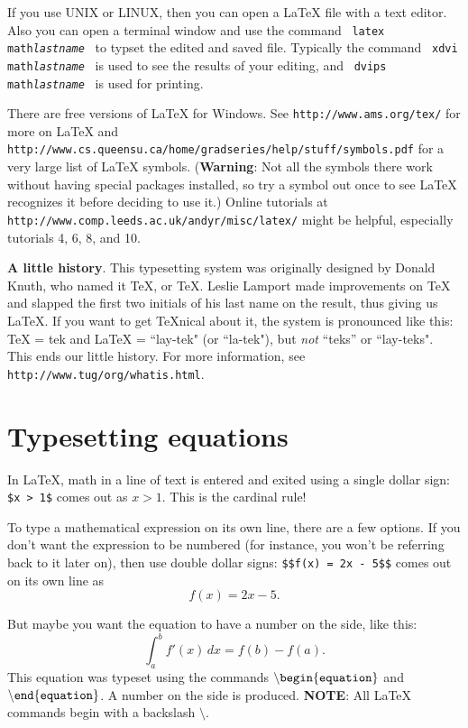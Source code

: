 \documentclass[12pt,letterpaper]{amsart}
\newcommand{\latex}{\LaTeX}
\newcommand{\tex}{\TeX}
\newcommand{\sm}{\setminus}
\newcommand{\bgn}[1]{$\tt {\sm}begin\{#1\}$}
\newcommand{\nd}[1]{$\tt {\sm}end\{#1\}$}
\theoremstyle{plain}
\theoremstyle{definition}
\numberwithin{equation}{section}
\begin{document}
If you use UNIX or LINUX, then  you can open a \latex{} file with a text 
editor. Also you 
can open a terminal window and use the command \ {\tt latex 
math{\it lastname}} \ to typset the edited and saved file. Typically the 
command \ {\tt xdvi math{\it lastname}} \ is used to see the results 
of your editing, and \ {\tt dvips math{\it lastname}} \ is used for 
printing. 

There are free versions of \latex{} for Windows. See 
{\tt http://www.ams.org/tex/}  
for more on \latex{} and 
{\tt http://www.cs.queensu.ca/home/gradseries/help/stuff/symbols.pdf} 
for a very large list of \latex{} symbols. 
({\bf Warning}: Not all the symbols there work without having special 
packages installed, so try a symbol out once to see \latex{} 
recognizes it before deciding to use it.) 
Online tutorials at 
{\tt http://www.comp.leeds.ac.uk/andyr/misc/latex/} 
might be helpful, especially 
tutorials 4, 6, 8, and 10. 

{\bf A little history}. This typesetting system was originally designed by Donald Knuth, 
who named it
TeX, or \tex.  Leslie Lamport made improvements on \tex{} 
and slapped the first two initials of his last name on the result, thus giving us 
\latex.  If you want to get \tex{nical} about it, the system is pronounced 
like this: 
\tex{} = tek and \latex{} = ``lay-tek" (or ``la-tek"), but {\it not} 
``teks'' or ``lay-teks". 
This ends our little history.  For more information, see {\tt http://www.tug/org/whatis.html}.



\section{Typesetting equations}\label{tsetsec}


In \latex, math in a line of text is entered and exited using 
a single dollar sign: {\tt \$x > 1\$} comes out as $x > 1$. 
This is the cardinal rule!  

To type a mathematical expression on its own line, 
there are a few options.
If you don't want the expression to be numbered 
(for instance, you won't be referring back to it later on), then use
double dollar signs: {\tt \$\$f(x) = 2x - 5\$\$} comes out 
on its own line as 
$$
f(x) = 2x - 5.
$$


But maybe you want the equation to have a number on the side, like this:
\begin{equation}\label{eqn-one}
\int_a^b f'(x)\,dx = f(b) - f(a).
\end{equation}
This equation was typeset 
using the commands 
\bgn{equation}
and \nd{equation}.
A number on the side is produced. 
{\bf NOTE}:  
All \latex{} commands begin with a backslash $\sm$.
\end{document}
